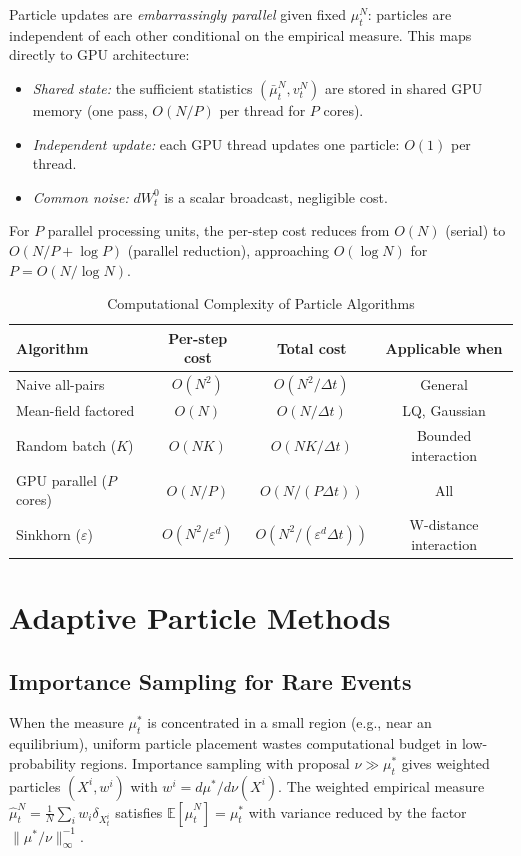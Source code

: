 Particle updates are \emph{embarrassingly parallel} given fixed $\mu_t^N$:
particles are independent of each other conditional on the empirical measure. This
maps directly to GPU architecture:
\begin{itemize}
    \item \textit{Shared state:} the sufficient statistics $(\bar\mu_t^N, v_t^N)$
    are stored in shared GPU memory (one pass, $O(N/P)$ per thread for $P$ cores).
    \item \textit{Independent update:} each GPU thread updates one particle:
    $O(1)$ per thread.
    \item \textit{Common noise:} $dW_t^0$ is a scalar broadcast, negligible cost.
\end{itemize}
For $P$ parallel processing units, the per-step cost reduces from $O(N)$ (serial)
to $O(N/P + \log P)$ (parallel reduction), approaching $O(\log N)$ for
$P = O(N / \log N)$.

\begin{table}[ht]
\centering
\caption{Computational Complexity of Particle Algorithms}
\label{tab:particle-complexity}
\begin{tabular}{lccc}
\toprule
\textbf{Algorithm} & \textbf{Per-step cost} & \textbf{Total cost} &
    \textbf{Applicable when} \\
\midrule
Naive all-pairs & $O(N^2)$ & $O(N^2 / \Delta t)$ & General \\
Mean-field factored & $O(N)$ & $O(N / \Delta t)$ & LQ, Gaussian \\
Random batch ($K$) & $O(NK)$ & $O(NK / \Delta t)$ & Bounded interaction \\
GPU parallel ($P$ cores) & $O(N/P)$ & $O(N/(P\Delta t))$ & All \\
Sinkhorn ($\varepsilon$) & $O(N^2/\varepsilon^d)$ & $O(N^2/({\varepsilon^d\Delta t}))$ &
    W-distance interaction \\
\bottomrule
\end{tabular}
\end{table}

\section{Adaptive Particle Methods}

\subsection{Importance Sampling for Rare Events}

When the measure $\mu_t^*$ is concentrated in a small region (e.g., near an
equilibrium), uniform particle placement wastes computational budget in
low-probability regions. Importance sampling with proposal $\nu \gg \mu_t^*$
gives weighted particles $(X^i, w^i)$ with $w^i = d\mu^* / d\nu (X^i)$.
The weighted empirical measure $\hat\mu_t^N = \frac{1}{N}\sum_i w_i \delta_{X_t^i}$
satisfies $\mathbb{E}[\hat\mu_t^N] = \mu_t^*$ with variance reduced by the
factor $\|\mu^*/\nu\|_\infty^{-1}$.

